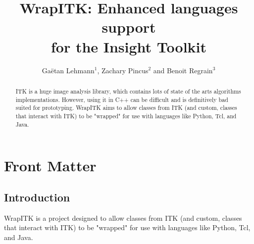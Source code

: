 \documentclass{InsightArticle}
\title{WrapITK: Enhanced languages support\\ for the Insight Toolkit}
\author{Ga\"etan Lehmann{$^1$}{\small{,}} Zachary Pincus{$^2$} {\small{and}} Benoit Regrain{$^3$}}
\begin{document}
\lstset{language=python}
\maketitle

\ifhtml
\chapter*{Front Matter\label{front}}
\fi


\begin{abstract}
\noindent
ITK is a huge image analysis library, which contains lots of state of the arts
algorithms implementations. However, using it in C++ can be difficult and is
definitively bad suited for prototyping. WrapITK aims to allow classes from ITK
(and custom, classes that interact with ITK) to be "wrapped" for use with
languages like Python, Tcl, and Java.
\end{abstract}

\tableofcontents

\section{Introduction}

WrapITK is a project designed to allow classes from ITK (and custom, classes
that interact with ITK) to be "wrapped" for use with languages like
Python, Tcl, and Java.
\end{document}
